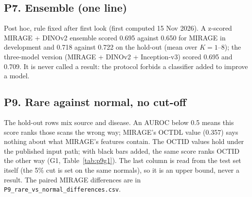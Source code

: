 \subsection*{P7. Ensemble (one line)}
Post hoc, rule fixed after first look (first computed 15 Nov 2026). A z-scored MIRAGE + DINOv2 ensemble scored 0.695 against 0.650 for MIRAGE in development and 0.718 against 0.722 on the hold-out (mean over $K=1$--8); the three-model version (MIRAGE + DINOv2 + Inception-v3) scored 0.695 and 0.709. It is never called a result: the protocol forbids a classifier added to improve a model.

\subsection*{P9. Rare against normal, no cut-off}
\begin{table}[!htbp]
\caption{Post hoc, rule committed 18 Nov 2026. Per-scan AUROC of one prototype score (the largest rare cosine minus the largest common cosine), disease scans against normal scans of the same set, with 95\% intervals from 2,000 bootstrap resamples (patients for OCTDL, images for OCTID). Beside it, the locked nine-way argmax point (share of disease scans called any rare class; share of normal scans called rare, as in R1) and the share of disease scans above the score that only 5\% of that set's normals exceed.}
\label{tab:p9}
\centering\footnotesize

\end{table}
The hold-out rows mix source and disease. An AUROC below 0.5 means this score ranks those scans the wrong way; MIRAGE's OCTDL value (0.357) says nothing about what MIRAGE's features contain. The OCTID values hold under the published input path; with black bars added, the same score ranks OCTID the other way (G1, Table~\ref{tab:p9g1}). The last column is read from the test set itself (the 5\% cut is set on the same normals), so it is an upper bound, never a result. The paired MIRAGE differences are in \texttt{P9\_rare\_vs\_normal\_differences.csv}.
\begin{table}[!htbp]
\caption{Post hoc: P9 on G1's padded MIRAGE and Inception-v3 features (P9 rule committed 18 Nov 2026; G1 rule 16 Nov 2026, computed 18 Nov 2026); a sensitivity check outside A2 A-11 that never replaces a locked result. Columns as in Table~\ref{tab:p9}.}
\label{tab:p9g1}
\centering\footnotesize

\end{table}

